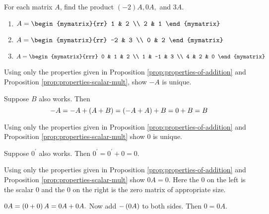 \begin{enumialphparenastyle}

\begin{ex} For each matrix $A$, find the product $(-2)A, 0A,$ and $3A$. 
\begin{enumerate}
\item
$A = \begin{mymatrix}{rr}
1 & 2 \\
2 & 1 
\end{mymatrix}$

\item
$A = \begin{mymatrix}{rr}
-2 & 3 \\
0 & 2 
\end{mymatrix}$

\item
$A = \begin{mymatrix}{rrr}
0 & 1 & 2 \\
1 & -1 & 3 \\
4 & 2 & 0 
\end{mymatrix}$
\end{enumerate}
\end{ex}

\begin{ex} \label{addinvrstunique} Using only the properties given in Proposition \ref{prop:properties-of-addition}
 and Proposition \ref{prop:properties-scalar-mult}, 
show $-A$ is unique.
\begin{sol}
 Suppose $B$ also works. Then
\[
-A=-A+\left(A+B\right) =\left(-A+A\right) +B=0+B=B
\]
\end{sol}
\end{ex}

\begin{ex} Using only the properties given in Proposition \ref{prop:properties-of-addition} 
and Proposition \ref{prop:properties-scalar-mult}
show $0$ is unique. 
\begin{sol}
Suppose $0^{\prime }$ also works. Then $0^{\prime }=0^{\prime }+0=0.$
\end{sol}
\end{ex}

\begin{ex} Using only the properties given in Proposition \ref{prop:properties-of-addition}
 and Proposition \ref{prop:properties-scalar-mult} show $0A=0.$ Here
the $0$ on the left is the scalar $0$ and the $0$ on the right is the zero matrix of appropriate size.
\begin{sol}
$0A=\left(0+0\right) A=0A+0A.$ Now add $-\left(
0A\right) $ to both sides. Then $0=0A$.
\end{sol}
\end{ex}


\end{enumialphparenastyle}
